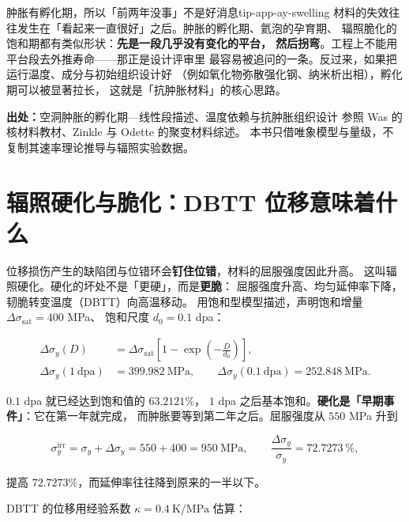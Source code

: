 \begin{tip}{肿胀有孵化期，所以「前两年没事」不是好消息}{tip-app-ay-swelling}
材料的失效往往发生在「看起来一直很好」之后。肿胀的孵化期、氦泡的孕育期、
辐照脆化的饱和期都有类似形状：\textbf{先是一段几乎没有变化的平台，
然后拐弯}。工程上不能用平台段去外推寿命——那正是设计评审里
最容易被追问的一条。反过来，如果把运行温度、成分与初始组织设计好
（例如氧化物弥散强化钢、纳米析出相），孵化期可以被显著拉长，
这就是「抗肿胀材料」的核心思路。
\end{tip}

{\footnotesize
\textbf{出处：}空洞肿胀的孵化期—线性段描述、温度依赖与抗肿胀组织设计
参照 Was 的核材料教材、Zinkle 与 Odette 的聚变材料综述。
本书只借唯象模型与量级，不复制其速率理论推导与辐照实验数据。
}

\section{辐照硬化与脆化：DBTT 位移意味着什么}
\label{sec:app-ay-hard}

位移损伤产生的缺陷团与位错环会\textbf{钉住位错}，材料的屈服强度因此升高。
这叫辐照硬化。硬化的坏处不是「更硬」，而是\textbf{更脆}：
屈服强度升高、均匀延伸率下降，韧脆转变温度（DBTT）向高温移动。
用饱和型模型描述，声明饱和增量 $\Delta\sigma_\mathrm{sat}=400$ MPa、
饱和尺度 $d_0=0.1$ dpa：

\begin{equation}
\begin{aligned}
\Delta\sigma_y(D)&=\Delta\sigma_\mathrm{sat}
\left[1-\exp\!\left(-\frac{D}{d_0}\right)\right],\\
\Delta\sigma_y(1\ \mathrm{dpa})&=399.982\ \mathrm{MPa},
\qquad
\Delta\sigma_y(0.1\ \mathrm{dpa})=252.848\ \mathrm{MPa}.
\end{aligned}
\label{eq:app-ay-hard}
\end{equation}

$0.1$ dpa 就已经达到饱和值的 $63.2121\%$，
$1$ dpa 之后基本饱和。\textbf{硬化是「早期事件」}：它在第一年就完成，
而肿胀要等到第二年之后。屈服强度从 $550$ MPa 升到

\begin{equation}
\sigma_y^\mathrm{irr}=\sigma_y+\Delta\sigma_y=550+400=950\ \mathrm{MPa},
\qquad
\frac{\Delta\sigma_y}{\sigma_y}=72.7273\ \%,
\label{eq:app-ay-sum}
\end{equation}

提高 $72.7273\%$，而延伸率往往降到原来的一半以下。

DBTT 的位移用经验系数 $\kappa=0.4\ \mathrm{K/MPa}$ 估算：


